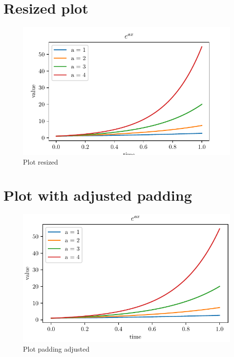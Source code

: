 \documentclass{article}
\begin{document}
\section{Resized plot}
\lipsum[5]
\begin{figure}[!ht]
    \centering
    \includegraphics{images/plot4.pdf}
    \caption{Plot resized}
    \label{fig:plot_4}
\end{figure}
\clearpage

\section{Plot with adjusted padding}
\lipsum[6]
\begin{figure}[!ht]
    \centering
    \includegraphics{images/plot5.pdf}
    \caption{Plot padding adjusted}
    \label{fig:plot_5}
\end{figure}
\clearpage
\end{document}
